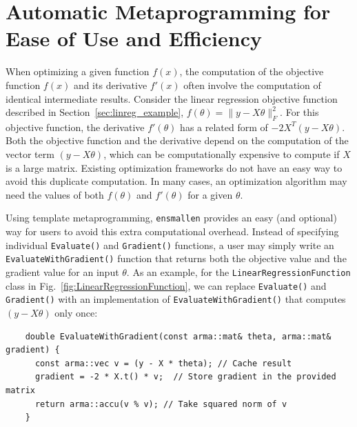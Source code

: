 \documentclass{article}
\begin{document}
\vspace*{-0.3em}
\section{Automatic Metaprogramming for Ease of Use and Efficiency}
\vspace*{-0.5em}

When optimizing a given function $f(x)$, the computation of
the objective function $f(x)$ and its derivative $f'(x)$ often involve the
computation of identical intermediate results.  Consider the linear regression
objective function described
in Section~\ref{sec:linreg_example}, {\small $f(\theta) = \| y - X\theta \|_F^2$}.
For this objective function, the derivative $f'(\theta)$ has a related form of
{\small $-2 X^T (y -X \theta)$}.  Both the objective function and the derivative 
depend on the computation of the vector term {\small $(y - X \theta)$},
which can be computationally expensive to compute if $X$ is a large matrix.
Existing optimization frameworks do not have an easy way to avoid
this duplicate computation. In many cases, an optimization algorithm
may need the values of both $f(\theta)$ and $f'(\theta)$ for a given $\theta$.

Using template metaprogramming, {\tt ensmallen} provides an easy (and
optional) way for users to avoid this extra computational overhead.  Instead of
specifying individual \texttt{\small Evaluate()} and \texttt{\small Gradient()} functions, a user
may simply write an \texttt{\small EvaluateWithGradient()} function that returns both the
objective value and the gradient value for an input $\theta$.  As an example,
for the 
\texttt{LinearRegressionFunction} class in Fig.~\ref{fig:LinearRegressionFunction},
we can replace \texttt{\small Evaluate()} and \texttt{\small Gradient()}
with an implementation of \texttt{\small EvaluateWithGradient()}
that computes {\small $(y - X \theta)$} only once:

\vspace*{-0.5em}
\begin{adjustbox}{scale={0.95}{0.95}}
\begin{minipage}{1\textwidth}
\begin{verbatim}
    double EvaluateWithGradient(const arma::mat& theta, arma::mat& gradient) {
      const arma::vec v = (y - X * theta); // Cache result
      gradient = -2 * X.t() * v;  // Store gradient in the provided matrix
      return arma::accu(v % v); // Take squared norm of v
    }
\end{verbatim}
\end{minipage}
\end{adjustbox}
\vspace*{-0.5em}
\end{document}
